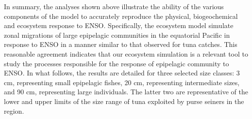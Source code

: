 In summary, the analyses shown above illustrate the ability of the various components of the model to accurately reproduce the physical, biogeochemical and ecosystem response to ENSO. Specifically, the ecosystem model simulate zonal migrations of large epipelagic communities in the equatorial Pacific in response to ENSO in a manner similar to that observed for tuna catches. This reasonable agreement indicates that our ecosystem simulation is a relevant tool to study the processes responsible for the response of epipelagic community to ENSO. In what follows, the results are detailed for three selected size classes: 3 cm, representing small epipelagic fishes, 20 cm, representing intermediate sizes, and 90 cm, representing large individuals. The latter two are representative of the lower and upper limits of the size range of tuna exploited by purse seiners in the region.

